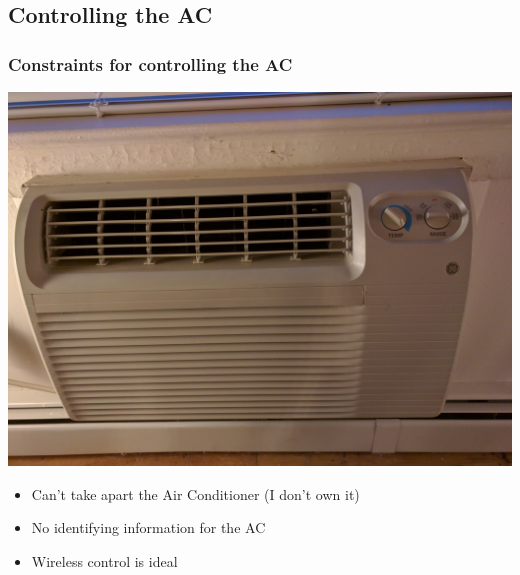 \documentclass[aspectratio=169,11pt,hyperref={colorlinks=true}]{beamer}
\begin{document}
\subsection{Controlling the AC}
\begin{frame}
    \frametitle{Constraints for controlling the AC}
    \begin{center}
        \includegraphics[width=.53\textwidth]{AC_unit.jpeg}
    \end{center}
    \begin{itemize}
        \item Can't take apart the Air Conditioner (I don't own it)
        \item No identifying information for the AC
        \item Wireless control is ideal
    \end{itemize}
\end{frame}
\end{document}
